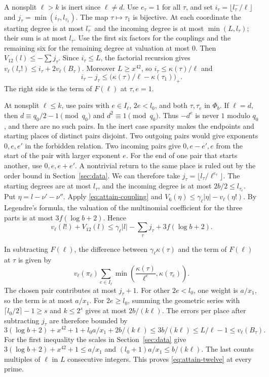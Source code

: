 A nonsplit \(\ell>k\) is inert since \(\ell\ne d\).
Use \(e_\tau=1\) for all \(\tau\), and set
\(i_\tau=\lfloor l_\tau^-/\ell\rfloor\) and \(j_\tau=\min(i_\tau,l_{\tau_1})\).
The map \(\tau\mapsto\tau_1\) is bijective. At each coordinate the
starting degree is at most \(l_\tau^-\) and the incoming degree is at most
\(\min(L,l_\tau)\); their sum is at most \(l_\tau\).
Use the first six factors for the couplings and the remaining six for
the remaining degree at valuation at most \(0\). Then \(V_{12}(l)\le-\sum j_\tau\).
Since \(i_\tau\le L\), the factorial recursion gives
\(v_\ell(l_\tau!)\le i_\tau+2v_\ell(B_\tau)\).
Moreover \(L\ge x^{42}\), so \(i_\tau\le\kappa(\tau)/\ell\) and
\[
 i_\tau-j_\tau\le
   \bigl(\kappa(\tau)/\ell-\kappa(\tau_1)\bigr)_+ .
\]
The right side is the term of \(F(\ell)\) at \(\tau,e=1\).

At nonsplit \(\ell\le k\), use pairs with \(e\in I_\ell\), \(2e<l_0\), and both
\(\tau,\tau_e\) in \(\Phi_b\). If \(\ell=d\), then \(d\equiv q_0/2-1\pmod{q_0}\) and
\(d^2\equiv1\pmod{q_0}\). Thus \(-d^e\) is never \(1\) modulo \(q_0\),
and there are no such pairs. In the inert case sparsity makes the endpoints and starting places of
distinct pairs disjoint. Two outgoing pairs would give exponents \(0,e,e'\)
in the forbidden relation. Two incoming pairs give \(0,e-e',e\)
from the start of the pair with larger exponent \(e\).
For the end of one pair that starts another, use \(0,e,e+e'\).
A nontrivial return to the same place is ruled out by the order bound in
Section~\ref{sec:data}. We can therefore take
\(j_\tau=\lfloor l_\tau/\ell^{e_\tau}\rfloor\).
The starting degrees are at most \(l_\tau\), and the incoming degree
is at most \(2b/2\le l_{\tau_e}\). Put \(\eta=l-\nu'-\nu''\).
Apply \eqref{eq:attain-coupling} and
\(V_6(\eta)\le\gamma_\ell|\eta|-v_\ell(\eta!)\).
By Legendre's formula, the valuation of the multinomial coefficient
for the three parts is at most \(3f(\log b+2)\). Hence
\[
 v_\ell(l!)+V_{12}(l)\le
   \gamma_\ell |l|-\sum_\tau j_\tau+3f(\log b+2).
\]

In subtracting \(F(\ell)\), the difference between
\(\gamma_\ell\kappa(\tau)\) and the term of \(F(\ell)\) at \(\tau\) is
given by
\[
 v_\ell(\pi_\ell)\sum_{e\in I_\ell}\min\!\left(\frac{\kappa(\tau)}{\ell^e},\kappa(\tau_e)\right) .
\]
The chosen pair contributes at most \(j_\tau+1\).
For other \(2e<l_0\), one weight is \(a/x_1\), so the term is at most \(a/x_1\).
For \(2e\ge l_0\), summing the geometric series with
\(\lceil l_0/2\rceil-1\ge s\) and \(k\le2^s\) gives at most \(2b/(k\ell)\).
The errors per place after subtracting \(j_\tau\) are therefore bounded by
\[
 3(\log b+2)+x^{42}+1+l_0 a/x_1+2b/(k\ell)
 \le 3b/(k\ell)\le L/\ell-1\le v_\ell(B_\tau).
\]
For the first inequality the scales in Section~\ref{sec:data} give
\(3(\log b+2)+x^{42}+1\le a/x_1\) and
\((l_0+1)a/x_1\le b/(k\ell)\). The last counts multiples of \(\ell\)
in \(L\) consecutive integers. This proves \eqref{eq:attain-twelve}
at every prime.

